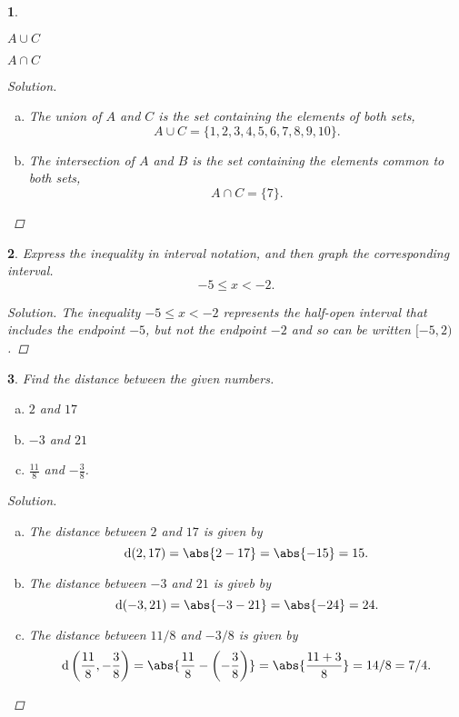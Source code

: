 \documentclass[12pt]{amsart}
\newtheorem{thm}{}
\begin{document}
\setcounter{thm}{28}
\begin{thm}
  \begin{inparaenum}[(a)]
  \item
    $A \cup C$
    \hspace{50mm}
  \item
    $A \cap C$
  \end{inparaenum}
  
  \begin{proof}[Solution]
    \begin{enumerate}[(a)]
    \item
      The union of $A$ and $C$ is the set containing the elements of both sets, 
      $$A \cup C = \{1, 2, 3, 4, 5, 6, 7, 8, 9, 10\}.$$
    \item
      The intersection of $A$ and $B$ is the set containing the elements common to both sets,
      $$A \cap C = \{7\}.$$
    \end{enumerate}
  \end{proof}
\end{thm}

\setcounter{thm}{48}
\begin{thm}
  Express the inequality in interval notation, and then graph the corresponding interval.
  $$-5 \leq x < -2.$$
  
  \begin{proof}[Solution]
    The inequality $-5 \leq x < -2$ represents the half-open interval that includes the endpoint $-5$, but not the endpoint $-2$ and so can be written $[-5, 2)$.
    
  \end{proof}
\end{thm}

\setcounter{thm}{62}
\begin{thm}
  Find the distance between the given numbers.\\
  \begin{enumerate}[(a)]
  \item
    $2$ and $17$ 
  \item
    $-3$ and $21$
  \item
    $\frac{11}{8}$ and $-\frac{3}{8}$.
  \end{enumerate}
  
  \begin{proof}[Solution]
    \begin{enumerate}[(a)]
    \item
      The distance between $2$ and $17$ is given by
      $$\operatorname{d}(2, 17) = \abs{2 - 17} = \abs{-15} = 15.$$
    \item
      The distance between $-3$ and $21$ is giveb by
      $$\operatorname{d}(-3, 21) = \abs{-3 - 21} = \abs{-24} = 24.$$
    \item
      The distance between $11/8$ and $-3/8$ is given by 
      $$\operatorname{d}\left(\frac{11}{8}, -\frac{3}{8}\right) = \abs{\frac{11}{8} - \left(-\frac{3}{8}\right)} = \abs{\frac{11 + 3}{8}} = 14/8 = 7/4.$$
    \end{enumerate}
  \end{proof}
\end{thm}
\end{document}
